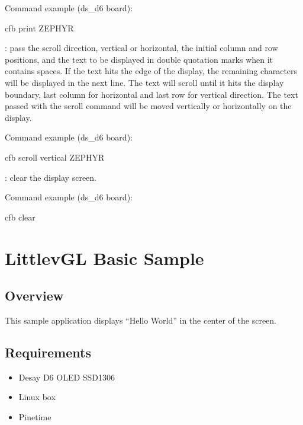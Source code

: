 \documentclass[letterpaper,10pt,english]{sphinxmanual}
\begin{document}
Command example (ds\_d6 board):

\begin{sphinxVerbatim}[commandchars=\\\{\}]
 cfb print   ZEPHYR
\end{sphinxVerbatim}

: pass the scroll direction, vertical or horizontal, the initial
column and row positions, and the text to be displayed in double quotation
marks when it contains spaces. If the text hits the edge of the display, the
remaining characters will be displayed in the next line. The text will scroll
until it hits the display boundary, last column for horizontal and last row
for vertical direction. The text passed with the scroll command will be moved
vertically or horizontally on the display.

Command example (ds\_d6 board):

\begin{sphinxVerbatim}[commandchars=\\\{\}]
 cfb scroll vertical   ZEPHYR
\end{sphinxVerbatim}

: clear the display screen.

Command example (ds\_d6 board):

\begin{sphinxVerbatim}[commandchars=\\\{\}]
 cfb clear
\end{sphinxVerbatim}


\section{LittlevGL Basic Sample}
\label{\detokenize{samples/sampleslvglREADME:littlevgl-basic-sample}}\label{\detokenize{samples/sampleslvglREADME:lvgl-sample}}\label{\detokenize{samples/sampleslvglREADME::doc}}

\subsection{Overview}
\label{\detokenize{samples/sampleslvglREADME:overview}}
This sample application displays “Hello World” in the center of the screen.


\subsection{Requirements}
\label{\detokenize{samples/sampleslvglREADME:requirements}}\begin{itemize}
\item {} 
Desay D6 OLED SSD1306

\item {} 
Linux box

\item {} 
Pinetime

\end{itemize}
\end{document}
